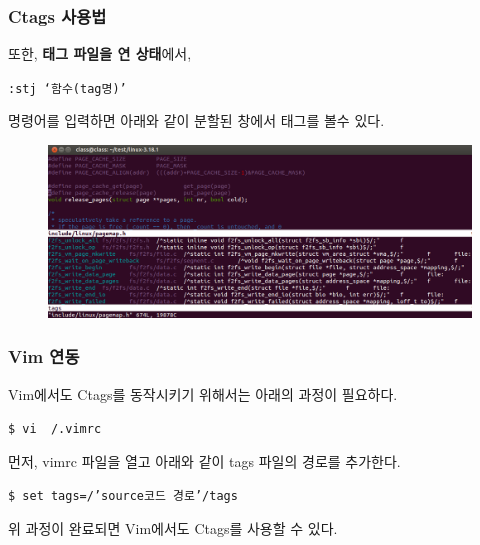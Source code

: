 \documentclass[newPxFont,sthlmFooter,nooffset]{beamer}
\begin{document}
\begin{frame}[containsverbatim,t]
  \frametitle{Ctags 사용법}
또한, \textbf{태그 파일을 연 상태}에서,
\begin{mdframed}[backgroundcolor=lightgray,hidealllines=true]
\texttt{\textcolor[rgb]{0,0,0}{:stj `함수(tag명)'}}
\end{mdframed}
\bigskip
명령어를 입력하면 아래와 같이 분할된 창에서 태그를 볼수 있다.
\smallskip
\begin{figure}[h]
\includegraphics[width=0.98\linewidth]{./figure/stj.png}
\end{figure}
\end{frame}

\begin{frame}[containsverbatim,t]
  \frametitle{Vim 연동}
Vim에서도 Ctags를 동작시키기 위해서는 아래의 과정이 필요하다.
\begin{mdframed}[backgroundcolor=lightgray,hidealllines=true]
\texttt{\textcolor[rgb]{0,0,0}{\$ vi ~/.vimrc}}
\end{mdframed}
\bigskip
먼저, vimrc 파일을 열고 아래와 같이 tags 파일의 경로를 추가한다.
\begin{mdframed}[backgroundcolor=lightgray,hidealllines=true]
\texttt{\textcolor[rgb]{0,0,0}{\$ set tags=/'source코드 경로'/tags}}
\end{mdframed}
\bigskip
위 과정이 완료되면 Vim에서도 Ctags를 사용할 수 있다. 
\end{frame}
\end{document}
